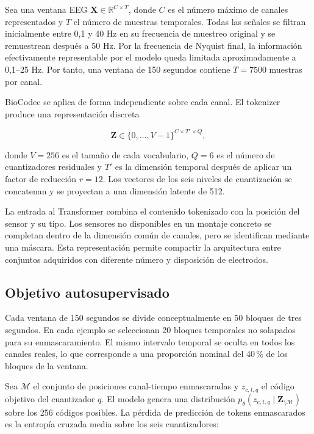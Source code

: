 Sea una ventana EEG
\(\mathbf{X}\in\mathbb{R}^{C\times T}\), donde \(C\) es el número máximo de canales representados y \(T\) el número de muestras temporales. Todas las señales se filtran inicialmente entre 0,1 y 40 Hz en su frecuencia de muestreo original y se remuestrean después a 50 Hz. Por la frecuencia de Nyquist final, la información efectivamente representable por el modelo queda limitada aproximadamente a 0,1--25 Hz. Por tanto, una ventana de 150 segundos contiene \(T=7500\) muestras por canal.

BioCodec se aplica de forma independiente sobre cada canal. El tokenizer produce una representación discreta

\begin{equation}
\mathbf{Z}\in
\{0,\ldots,V-1\}^{C\times T'\times Q},
\end{equation}

\noindent donde \(V=256\) es el tamaño de cada vocabulario, \(Q=6\) es el número de cuantizadores residuales y \(T'\) es la dimensión temporal después de aplicar un factor de reducción \(r=12\). Los vectores de los seis niveles de cuantización se concatenan y se proyectan a una dimensión latente de 512.

La entrada al Transformer combina el contenido tokenizado con la posición del sensor y su tipo. Los sensores no disponibles en un montaje concreto se completan dentro de la dimensión común de canales, pero se identifican mediante una máscara. Esta representación permite compartir la arquitectura entre conjuntos adquiridos con diferente número y disposición de electrodos.

\subsection{Objetivo autosupervisado}

Cada ventana de 150 segundos se divide conceptualmente en 50 bloques de tres segundos. En cada ejemplo se seleccionan 20 bloques temporales no solapados para su enmascaramiento. El mismo intervalo temporal se oculta en todos los canales reales, lo que corresponde a una proporción nominal del 40\,\% de los bloques de la ventana.

Sea \(\mathcal{M}\) el conjunto de posiciones canal-tiempo enmascaradas y \(z_{c,t,q}\) el código objetivo del cuantizador \(q\). El modelo genera una distribución
\(p_{\theta}(z_{c,t,q}\mid\mathbf{Z}_{\setminus\mathcal{M}})\)
sobre los 256 códigos posibles. La pérdida de predicción de tokens enmascarados es la entropía cruzada media sobre los seis cuantizadores:


